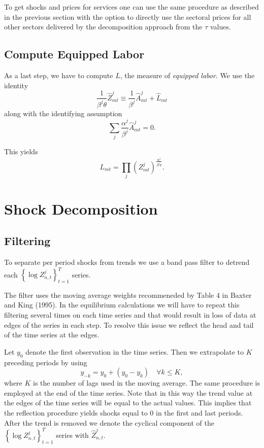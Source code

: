\documentclass[11pt,oneside,a4paper]{article}
\begin{document}
To get shocks and prices for services one can use the same procedure as described in the previous section with the option to directly use the sectoral prices for all other sectors delivered by the decomposition approach from the $\tau$ values.


\subsection{Compute Equipped Labor}
As a last step, we have to compute $L$, the measure of \emph{equipped labor}. We use the identity
$$\frac{1}{\beta^j \theta} \hat{Z}^j_{mt} \equiv \frac{1}{\beta^j} \hat{A}^j_{mt} + \hat{L}_{mt}$$ along with the identifying assumption
$$\sum_j \frac{\alpha^j}{\beta^j} \hat{A}^j_{mt} = 0.$$

This yields
$$L_{mt} = \prod_j \left(Z^j_{mt}\right)^{\frac{\alpha^j}{\beta^j \theta}}.$$

\newpage

\section{Shock Decomposition}
\subsection{Filtering}
To separate per period shocks from trends we use a band pass filter to detrend each $\left\{\log{Z^j_{n,t}}\right\}_{t=1}^T$ series.

The filter uses the moving average weights recommeneded by Table 4 in Baxter and King (1995). In the equilibrium calculations we will have to repeat this filtering several times on each time series and that would result in loss of data at edges of the series in each step. To resolve this issue we reflect the head and tail of the time series at the edges.

Let $y_0$ denote the first observation in the time series. Then we extrapolate to $K$ preceding periods by using
$$y_{-k} = y_0 + (y_0 - y_k)\quad \forall k \leq K, $$ where $K$ is the number of lags used in the moving average.
The same procedure is employed at the end of the time series. Note that in this way the trend value at the edges of the time series will be equal to the actual values. This implies that the reflection procedure yields shocks equal to 0 in the first and last periods.
After the trend is removed we denote the cyclical component of the $\left\{\log{Z^j_{n,t}}\right\}_{t=1}^T$ series with $\hat{Z}^j_{n,t}$.
\end{document}
